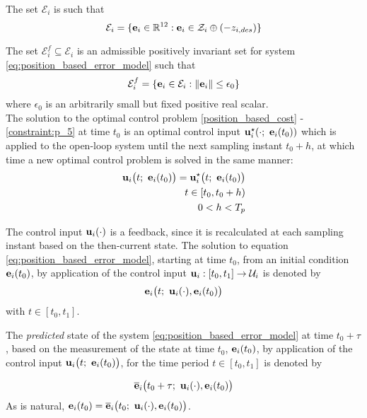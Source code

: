 The set $\mathcal{E}_i$ is such that
$$\mathcal{E}_i = \{\bm{\mathbf{e}}_i \in \mathbb{R}^{12} : \bm{\mathbf{e}}_i \in \mathcal{Z}_i \oplus (-z_{i,des} )\}$$

The set $\mathcal{E}_i^f \subseteq \mathcal{E}_i$ is an admissible positively
invariant set  for system \eqref{eq:position_based_error_model}
such that
\begin{align}
  \mathcal{E}_i^f = \{\bm{\mathbf{e}}_i \in \mathcal{E}_i : \|\bm{\mathbf{e}}_i\| \leq \epsilon_0 \}
\end{align}
where $\epsilon_0$ is an arbitrarily small but fixed positive real scalar.\\

The solution to the optimal control problem \eqref{position_based_cost} -
\eqref{constraint:p_5} at time $t_0$ is an optimal control input
$\bm{\mathbf{u}}_i^{\star}(\cdot;\ \bm{\mathbf{e}}_i(t_0))$ which
is applied to the open-loop system until the next sampling instant $t_0 + h$,
at which time a new optimal control problem is solved in the same manner:
\begin{align}
  \vect{u}_i\big(t;\ \vect{e}_i(t_0)\big) = \vect{u}_i^{\star}\big(t;\ \vect{e}_i(t_0)\big) \label{eq:position_based_optimal_u} \\
  t \in [t_0, t_0 + h) \nonumber \\
  0 < h < T_p \nonumber
\end{align}

The control input $\bm{\mathbf{u}}_i(\cdot)$ is a feedback, since it is
recalculated at each sampling instant based on the then-current state. The
solution to equation \eqref{eq:position_based_error_model}, starting at time
$t_0$, from an initial condition $\bm{\mathbf{e}}_i(t_0)$, by application of the
control input $\bm{\mathbf{u}}_i : [t_0, t_1] \to \mathcal{U}_i$ is denoted by
$$\bm{\mathbf{e}}_i\big(t;\ \bm{\mathbf{u}}_i(\cdot), \bm{\mathbf{e}}_i(t_0)\big)$$
with $t \in [t_0, t_1]$.

The \textit{predicted} state of the system \eqref{eq:position_based_error_model}
at time $t_0 + \tau$, based on the measurement of the state at time
$t_0$, $\bm{\mathbf{e}}_i(t_0)$, by application of the control input
$\vect{u}_i\big(t;\ \vect{e}_i(t_0)\big)$, for the time period $t \in [t_0, t_1]$
is denoted by

\begin{align}
  \overline{\bm{\mathbf{e}}}_i\big(t_0 + \tau;\ \bm{\mathbf{u}}_i(\cdot), \bm{\mathbf{e}}_i(t_0)\big) \label{eq:position_based_predicted_error_0}
\end{align}
As is natural,
$\vect{e}_i(t_0) = \overline{\vect{e}}_i\big(t_0;\ \vect{u}_i(\cdot), \vect{e}_i(t_0)\big)$.\\

